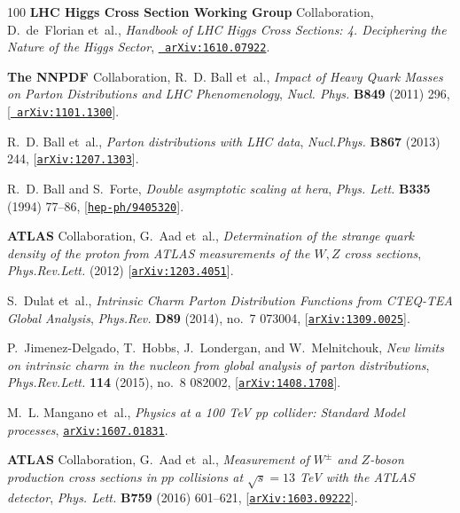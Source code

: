 \begin{thebibliography}{100}
{\bf LHC Higgs Cross Section Working Group} Collaboration, D.~de~Florian
  et~al., {\it {Handbook of LHC Higgs Cross Sections: 4. Deciphering the Nature
  of the Higgs Sector}},  \href{http://arxiv.org/abs/1610.07922}{{\tt
  arXiv:1610.07922}}.

{\bf {The NNPDF }} Collaboration, R.~D. Ball et~al., {\it {Impact of Heavy
  Quark Masses on Parton Distributions and LHC Phenomenology}},  {\em Nucl.
  Phys.} {\bf B849} (2011) 296, [\href{http://arxiv.org/abs/1101.1300}{{\tt
  arXiv:1101.1300}}].

R.~D. Ball et~al., {\it {Parton distributions with LHC data}},  {\em
  Nucl.Phys.} {\bf B867} (2013) 244,
  [\href{http://arxiv.org/abs/1207.1303}{{\tt arXiv:1207.1303}}].

R.~D. Ball and S.~Forte, {\it Double asymptotic scaling at hera},  {\em Phys.
  Lett.} {\bf B335} (1994) 77--86,
  [\href{http://arxiv.org/abs/hep-ph/9405320}{{\tt hep-ph/9405320}}].

{\bf ATLAS} Collaboration, G.~Aad et~al., {\it {Determination of the strange
  quark density of the proton from ATLAS measurements of the $W,Z$ cross
  sections}},  {\em Phys.Rev.Lett.} (2012)
  [\href{http://arxiv.org/abs/1203.4051}{{\tt arXiv:1203.4051}}].

S.~Dulat et~al., {\it {Intrinsic Charm Parton Distribution Functions from
  CTEQ-TEA Global Analysis}},  {\em Phys.Rev.} {\bf D89} (2014), no.~7 073004,
  [\href{http://arxiv.org/abs/1309.0025}{{\tt arXiv:1309.0025}}].

P.~Jimenez-Delgado, T.~Hobbs, J.~Londergan, and W.~Melnitchouk, {\it {New
  limits on intrinsic charm in the nucleon from global analysis of parton
  distributions}},  {\em Phys.Rev.Lett.} {\bf 114} (2015), no.~8 082002,
  [\href{http://arxiv.org/abs/1408.1708}{{\tt arXiv:1408.1708}}].

M.~L. Mangano et~al., {\it {Physics at a 100 TeV pp collider: Standard Model
  processes}},  \href{http://arxiv.org/abs/1607.01831}{{\tt arXiv:1607.01831}}.

{\bf ATLAS} Collaboration, G.~Aad et~al., {\it {Measurement of $W^{\pm}$ and
  $Z$-boson production cross sections in $pp$ collisions at $\sqrt{s}=13$ TeV
  with the ATLAS detector}},  {\em Phys. Lett.} {\bf B759} (2016) 601--621,
  [\href{http://arxiv.org/abs/1603.09222}{{\tt arXiv:1603.09222}}].


\end{thebibliography}
